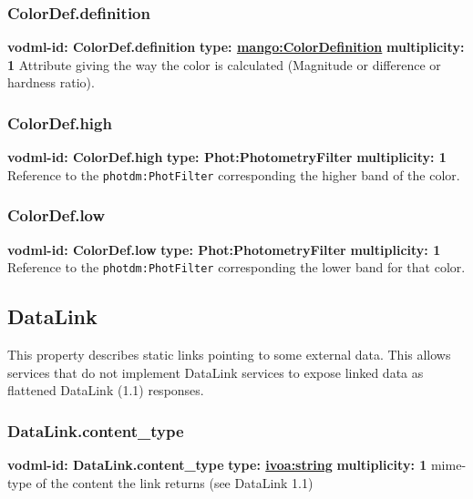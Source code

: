     \subsubsection{ColorDef.definition}
      \textbf{vodml-id: ColorDef.definition} \newline
      \textbf{type: \hyperref[sect:ColorDefinition]{mango:ColorDefinition}} \newline
      \textbf{multiplicity: 1} \newline 
      Attribute giving the way the color is calculated (Magnitude or difference or hardness ratio).

    \subsubsection{ColorDef.high}
      \textbf{vodml-id: ColorDef.high} \newline
      \textbf{type: Phot:PhotometryFilter} \newline
      \textbf{multiplicity: 1} \newline 
      Reference to the \texttt{photdm:PhotFilter} corresponding the higher band of the color.

    \subsubsection{ColorDef.low}
      \textbf{vodml-id: ColorDef.low} \newline
      \textbf{type: Phot:PhotometryFilter} \newline
      \textbf{multiplicity: 1} \newline 
      Reference to the \texttt{photdm:PhotFilter} corresponding the lower band for that color.

  \subsection{DataLink}
  \label{sect:DataLink}
    This property describes static links pointing to some external data. This allows services that do not implement DataLink services to expose linked data as flattened DataLink (1.1) responses.

    \subsubsection{DataLink.content\_type}
      \textbf{vodml-id: DataLink.content\_type} \newline
      \textbf{type: \hyperref[sect:ivoa]{ivoa:string}} \newline
      \textbf{multiplicity: 1} \newline 
      mime-type of the content the link returns (see DataLink 1.1)

